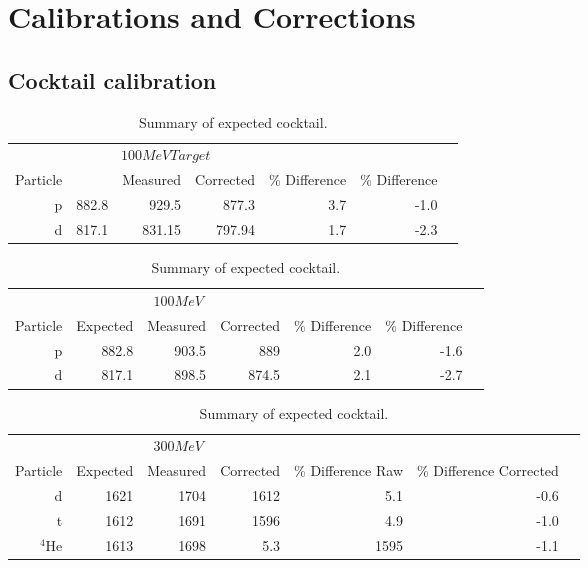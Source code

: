 \section{Calibrations and Corrections}


\subsection{Cocktail calibration}

\begin{table*}\centering
{}
\begin{tabular}{@{}rrrrrrr@{}}\toprule
& \multicolumn{3}{c}{$100 MeV Target$}\\
\cmidrule{2-4}
Particle &\phantom{abc} & Measured & Corrected & \% Difference & \% Difference\\
\midrule
p   & 882.8 & 929.5 & 877.3   &  3.7  & -1.0  \\
d   & 817.1 & 831.15 & 797.94 &  1.7  & -2.3\\
\bottomrule
\end{tabular}
\caption{Summary of expected cocktail. }
\label{tb:cocktail100tar}
\end{table*}

\begin{table*}\centering
{}
\begin{tabular}{@{}rrrrrrr@{}}\toprule
& \multicolumn{3}{c}{$100 MeV$}\\
\cmidrule{2-4}
Particle & Expected & Measured & Corrected & \% Difference & \% Difference\\
\midrule
p   & 882.8 & 903.5 & 889   &  2.0   & -1.6  \\
d   & 817.1 & 898.5 & 874.5 &  2.1   & -2.7\\
\bottomrule
\end{tabular}
\caption{Summary of expected cocktail. }
\label{tb:cocktail100}
\end{table*}

\begin{table*}\centering
{}
\begin{tabular}{@{}rrrrrrr@{}}\toprule
& \multicolumn{3}{c}{$300 MeV$}\\
\cmidrule{2-4}
Particle & Expected & Measured & Corrected & \% Difference Raw & \% Difference Corrected\\
\midrule
d   & 1621 & 1704 & 1612   &  5.1 & -0.6  \\
t   & 1612 & 1691 & 1596   &  4.9  & -1.0\\
${}^{4}$He   & 1613 & 1698 &  5.3 & 1595  & -1.1\\

\bottomrule
\end{tabular}
\caption{Summary of expected cocktail. }
\label{tb:cocktail300}
\end{table*}


